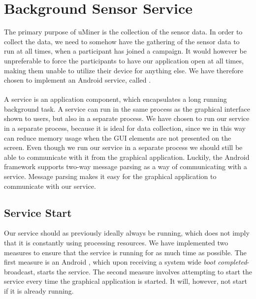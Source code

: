 
\section{Background Sensor Service}
\label{sec:background_sensor_service}
The primary purpose of uMiner is the collection of the sensor data. In order to collect the data, we need to somehow have the gathering of the sensor data to run at all times, when a participant has joined a campaign. It would however be unpreferable to force the participants to have our application open at all times, making them unable to utilize their device for anything else. We have therefore chosen to implement an Android service, called . 
\\\\
A service is an application component, which encapsulates a long running background task. A service can run in the same process as the graphical interface shown to users, but also in a separate process. We have chosen to run our service in a separate process, because it is ideal for data collection, since we in this way can reduce memory usage when the GUI elements are not presented on the screen. Even though we run our service in a separate process we should still be able to communicate with it from the graphical application. Luckily, the Android framework supports two-way message parsing as a way of communicating with a service. Message parsing makes it easy for the graphical application to communicate with our service.

\subsection{Service Start}
\label{sub:service_start}
Our service should as previously ideally always be running, which does not imply that it is constantly using processing resources. We have implemented two measures to ensure that the service is running for as much time as possible. The first measure is an Android , which upon receiving a system wide \emph{boot completed}-broadcast, starts the service. The second measure involves attempting to start the service every time the graphical application is started. It will, however, not start if it is already running.

